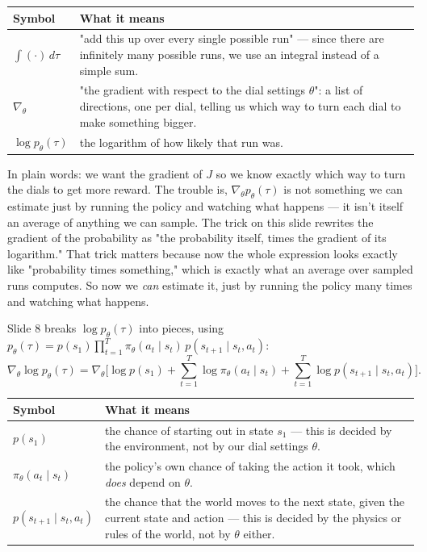\documentclass[11pt]{article}
\begin{document}
\begin{center}
\begin{tabular}{@{} >{\raggedright\arraybackslash}p{} >{\raggedright\arraybackslash}p{} @{}}
\toprule
\textbf{Symbol} & \textbf{What it means} \\
\midrule
$\int(\cdot)\,d\tau$ & "add this up over every single possible run" --- since there are infinitely many possible runs, we use an integral instead of a simple sum. \\
$\nabla_\theta$ & "the gradient with respect to the dial settings $\theta$": a list of directions, one per dial, telling us which way to turn each dial to make something bigger. \\
$\log p_\theta(\tau)$ & the logarithm of how likely that run was. \\
\bottomrule
\end{tabular}
\end{center}

In plain words: we want the gradient of $J$ so we know exactly which way to turn the dials to get more reward. The trouble is, $\nabla_\theta p_\theta(\tau)$ is not something we can estimate just by running the policy and watching what happens --- it isn't itself an average of anything we can sample. The trick on this slide rewrites the gradient of the probability as "the probability itself, times the gradient of its logarithm." That trick matters because now the whole expression looks exactly like "probability times something," which is exactly what an average over sampled runs computes. So now we \emph{can} estimate it, just by running the policy many times and watching what happens.

Slide 8 breaks $\log p_\theta(\tau)$ into pieces, using $p_\theta(\tau) = p(s_1)\prod_{t=1}^{T}\pi_\theta(a_t\mid s_t)\,p(s_{t+1}\mid s_t,a_t)$:
$$\nabla_\theta \log p_\theta(\tau) = \nabla_\theta\Big[\log p(s_1) + \sum_{t=1}^{T}\log\pi_\theta(a_t\mid s_t) + \sum_{t=1}^{T}\log p(s_{t+1}\mid s_t,a_t)\Big].$$
\begin{center}
\begin{tabular}{@{} >{\raggedright\arraybackslash}p{} >{\raggedright\arraybackslash}p{} @{}}
\toprule
\textbf{Symbol} & \textbf{What it means} \\
\midrule
$p(s_1)$ & the chance of starting out in state $s_1$ --- this is decided by the environment, not by our dial settings $\theta$. \\
$\pi_\theta(a_t\mid s_t)$ & the policy's own chance of taking the action it took, which \emph{does} depend on $\theta$. \\
$p(s_{t+1}\mid s_t,a_t)$ & the chance that the world moves to the next state, given the current state and action --- this is decided by the physics or rules of the world, not by $\theta$ either. \\
\bottomrule
\end{tabular}
\end{center}
\end{document}
